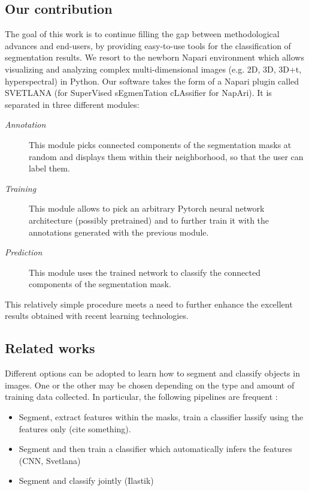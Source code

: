 \documentclass{article}
\begin{document}
\subsection{Our contribution}

The goal of this work is to continue filling the gap between methodological advances and end-users, by providing easy-to-use tools for the classification of segmentation results. 
We resort to the newborn Napari environment \cite{perkel2021python} which allows visualizing and analyzing complex multi-dimensional images (e.g. 2D, 3D, 3D+t, hyperspectral) in Python.
Our software takes the form of a Napari plugin called SVETLANA (for SuperVised sEgmenTation cLAssifier for NapAri). 
It is separated in three different modules: 
\begin{description}
  \item[\emph{Annotation}] This module picks connected components of the segmentation masks at random and displays them within their neighborhood, so that the user can label them.
  \item[\emph{Training}] This module allows to pick an arbitrary Pytorch \cite{paszke2019pytorch} neural network architecture (possibly pretrained) and to further train it with the annotations generated with the previous module.
  \item[\emph{Prediction}] This module uses the trained network to classify the connected components of the segmentation mask.
\end{description}
This relatively simple procedure meets a need to further enhance the excellent results obtained with recent learning technologies.

\subsection{Related works}

Different options can be adopted to learn how to segment and classify objects in images. 
One or the other may be chosen depending on the type and amount of training data collected.
In particular, the following pipelines are frequent :
\begin{itemize}
  \item Segment, extract features within the masks, train a classifier lassify using the features only (cite something).
  \item Segment and then train a classifier which automatically infers the features (CNN, Svetlana)
  \item Segment and classify jointly (Ilastik)
\end{itemize}
\end{document}
